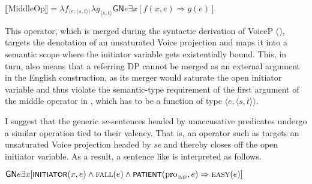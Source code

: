 \documentclass[output=paper,
modfonts,nonflat,
newtxmath
]{langsci/langscibook}
\begin{document}
\begin{exe} 
\ex \label{ex:lenardic: 35} $\llbracket$MiddleOp$\rrbracket = \lambda f_{\langle e,\langle s,t\rangle\rangle}\lambda g_{\langle s,t\rangle}\textsf{GN}e\exists x[f(x, e) \Rightarrow g(e)]$ 
\end{exe}

\par
\noindent This operator, which is merged during the syntactic derivation of VoiceP (\citealt{bruening2012}), targets the denotation of an unsaturated Voice projection and maps it into a semantic scope where the initiator variable  gets existentially bound. This, in turn, also means that a referring DP cannot be merged as an external argument in the English construction, as its merger would saturate the open initiator variable and thus violate the semantic-type requirement of the first argument of the middle operator in , which has to be a function of type $\langle e,\langle s,t\rangle\rangle$.

I suggest that the generic \textit{se}-sentences headed by unaccusative predicates undergo a similar operation tied to their valency. That is, an operator such as  targets an unsaturated Voice projection headed by \textit{se} and thereby closes off the open initiator variable. As a result, a sentence like  is interpreted as follows.

\begin{exe}
\ex \label{ex:lenardic: 36} $\textsf{GN}e\exists x[\cnst{initiator}(x, e) \land \textsc{fall}(e) \land \cnst{patient}(\mbox{pro}$\textsubscript{\textsc{imp}}$, e) \Rightarrow \textsc{easy}(e)]$
\end{exe}
\end{document}
